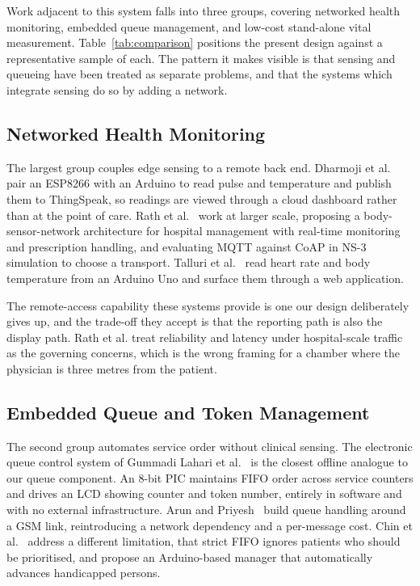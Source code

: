 Work adjacent to this system falls into three groups, covering networked health monitoring,
embedded queue management, and low-cost stand-alone vital measurement.
Table~\ref{tab:comparison} positions the present design against a representative sample of
each. The pattern it makes visible is that sensing and queueing have been treated as separate
problems, and that the systems which integrate sensing do so by adding a network.



\subsection{Networked Health Monitoring}
The largest group couples edge sensing to a remote back end. Dharmoji et al.~\cite{irjet2020}
pair an ESP8266 with an Arduino to read pulse and temperature and publish them to ThingSpeak,
so readings are viewed through a cloud dashboard rather than at the point of care. Rath et
al.~\cite{rath2021} work at larger scale, proposing a body-sensor-network architecture for
hospital management with real-time monitoring and prescription handling, and evaluating MQTT
against CoAP in NS-3 simulation to choose a transport. Talluri et al.~\cite{hrtemp2019} read
heart rate and body temperature from an Arduino Uno and surface them through a web
application.

The remote-access capability these systems provide is one our design deliberately gives up, and the
trade-off they accept is that the reporting path is also the display path. Rath et al. treat
reliability and latency under hospital-scale traffic as the governing concerns, which is the wrong
framing for a chamber where the physician is three metres from the patient.

\subsection{Embedded Queue and Token Management}
The second group automates service order without clinical sensing. The electronic queue control
system of Gummadi Lahari et al.~\cite{eqc2022} is the closest offline analogue to our queue
component. An 8-bit PIC maintains FIFO order across service counters and drives an LCD showing
counter and token number, entirely in software and with no external infrastructure. Arun and
Priyesh~\cite{qgsm2013} build queue handling around a GSM link, reintroducing a network dependency
and a per-message cost. Chin et al.~\cite{arpn2019} address a different limitation, that strict FIFO
ignores patients who should be prioritised, and propose an Arduino-based manager that automatically
advances handicapped persons.

